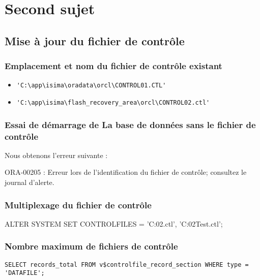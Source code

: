 \section{Second sujet}
\subsection{Mise à jour du fichier de contrôle}

\subsubsection{Emplacement et nom du fichier de contrôle existant}

\begin{itemize}
	\item \verb|'C:\app\isima\oradata\orcl\CONTROL01.CTL'|
	\item \verb|'C:\app\isima\flash_recovery_area\orcl\CONTROL02.ctl'|
\end{itemize}

\subsubsection{Essai de démarrage de La base de données sans le fichier de contrôle}

Nous obtenons l’erreur suivante :

\begin{verbatimtab}
ORA-00205 : Erreur lors de l'identification du fichier de contrôle;
            consultez le journal d'alerte.
\end{verbatimtab}

	\subsubsection{Multiplexage du fichier de contrôle}

\begin{verbatimtab}
ALTER SYSTEM SET CONTROLFILES = 'C:\app\isima\oradata\orcl\CONTROL02.ctl',
	'C:\app\isima\oradata\orcl{}\CTRL02Test.ctl';
\end{verbatimtab}

\subsubsection{Nombre maximum de fichiers de contrôle}

\begin{verbatim}
SELECT records_total FROM v$controlfile_record_section WHERE type = 'DATAFILE';
\end{verbatim}

